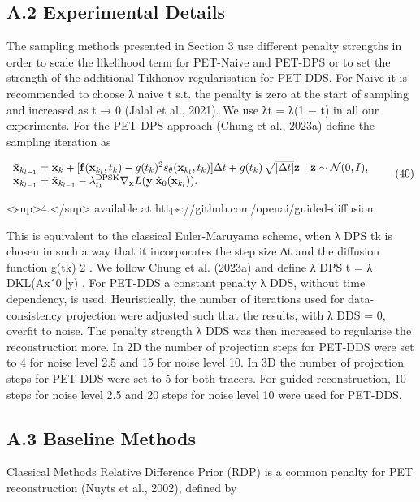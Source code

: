 \documentclass{article}
\begin{document}
\subsection{A.2 Experimental Details}

The sampling methods presented in Section 3 use different penalty strengths in order to scale the likelihood term for PET-Naive and PET-DPS or to set the strength of the additional Tikhonov regularisation for PET-DDS. For Naive it is recommended to choose λ naive t s.t. the penalty is zero at the start of sampling and increased as t → 0 (Jalal et al., 2021). We use λt = λ(1 − t) in all our experiments. For the PET-DPS approach (Chung et al., 2023a) define the sampling iteration as

$$\begin{array}{l}\tilde{\bf x}_{k_{l-1}}={\bf x}_{k}+[{\bf f}({\bf x}_{k_{l}},t_{k})-g(t_{k})^{2}s_{\theta}({\bf x}_{k_{l}},t_{k})]\Delta t+g(t_{k})\,\sqrt{|\Delta t|}{\bf z}\quad{\bf z}\sim{\cal N}(0,I),\\ {\bf x}_{k_{l-1}}=\tilde{\bf x}_{k_{l-1}}-\lambda_{t_{k}}^{\rm DPSK}\nabla_{\bf x}L({\bf y}|\hat{\bf x}_{0}({\bf x}_{k_{l}})).\end{array}\tag{40}$$

<sup>4.</sup> available at https://github.com/openai/guided-diffusion

This is equivalent to the classical Euler-Maruyama scheme, when λ DPS tk is chosen in such a way that it incorporates the step size ∆t and the diffusion function g(tk) 2 . We follow Chung et al. (2023a) and define λ DPS t = λ DKL(Axˆ0||y) . For PET-DDS a constant penalty λ DDS, without time dependency, is used. Heuristically, the number of iterations used for data-consistency projection were adjusted such that the results, with λ DDS = 0, overfit to noise. The penalty strength λ DDS was then increased to regularise the reconstruction more. In 2D the number of projection steps for PET-DDS were set to 4 for noise level 2.5 and 15 for noise level 10. In 3D the number of projection steps for PET-DDS were set to 5 for both tracers. For guided reconstruction, 10 steps for noise level 2.5 and 20 steps for noise level 10 were used for PET-DDS.

\subsection{A.3 Baseline Methods}

Classical Methods Relative Difference Prior (RDP) is a common penalty for PET reconstruction (Nuyts et al., 2002), defined by
\end{document}
